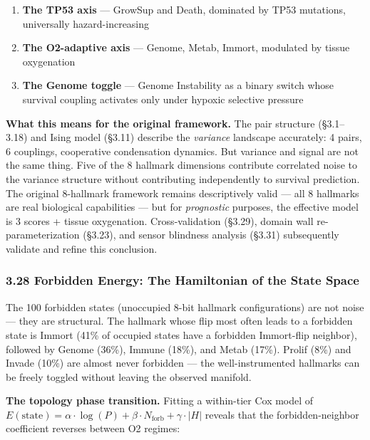 \documentclass[
  11pt,
]{article}
\providecommand{\tightlist}{%
  \setlength{\itemsep}{0pt}\setlength{\parskip}{0pt}}
\begin{document}
\begin{enumerate}
\def\labelenumi{\arabic{enumi}.}
\tightlist
\item
  \textbf{The TP53 axis} --- GrowSup and Death, dominated by TP53
  mutations, universally hazard-increasing
\item
  \textbf{The O2-adaptive axis} --- Genome, Metab, Immort, modulated by
  tissue oxygenation
\item
  \textbf{The Genome toggle} --- Genome Instability as a binary switch
  whose survival coupling activates only under hypoxic selective
  pressure
\end{enumerate}

\textbf{What this means for the original framework.} The pair structure
(§3.1--3.18) and Ising model (§3.11) describe the \emph{variance}
landscape accurately: 4 pairs, 6 couplings, cooperative condensation
dynamics. But variance and signal are not the same thing. Five of the 8
hallmark dimensions contribute correlated noise to the variance
structure without contributing independently to survival prediction. The
original 8-hallmark framework remains descriptively valid --- all 8
hallmarks are real biological capabilities --- but for \emph{prognostic}
purposes, the effective model is 3 scores + tissue oxygenation.
Cross-validation (§3.29), domain wall re-parameterization (§3.23), and
sensor blindness analysis (§3.31) subsequently validate and refine this
conclusion.

\subsubsection{3.28 Forbidden Energy: The Hamiltonian of the State
Space}\label{forbidden-energy-the-hamiltonian-of-the-state-space}

The 100 forbidden states (unoccupied 8-bit hallmark configurations) are
not noise --- they are structural. The hallmark whose flip most often
leads to a forbidden state is Immort (41\% of occupied states have a
forbidden Immort-flip neighbor), followed by Genome (36\%), Immune
(18\%), and Metab (17\%). Prolif (8\%) and Invade (10\%) are almost
never forbidden --- the well-instrumented hallmarks can be freely
toggled without leaving the observed manifold.

\textbf{The topology phase transition.} Fitting a within-tier Cox model
of
\(E(\mathrm{state}) = \alpha \cdot \log(P) + \beta \cdot N_{\mathrm{forb}} + \gamma \cdot |H|\)
reveals that the forbidden-neighbor coefficient reverses between O2
regimes:
\end{document}
